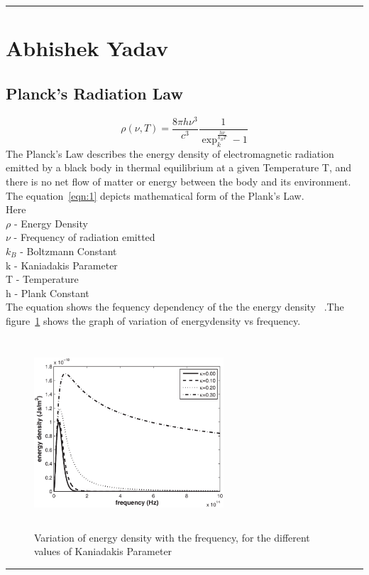 
\hrule
\section{Abhishek Yadav}
\subsection{Planck's Radiation Law}
\begin{equation}
	\rho(\nu,T)={\frac{8 \pi h \nu^3}{c^3}}  {\frac{1}{\exp_k^{\frac{h \nu}{k_BT}} - 1}}
	\label{eqn:1}
\end{equation}
The Planck's Law describes the energy density of electromagnetic radiation emitted by a black body in thermal equilibrium at a given Temperature T, and there is no net flow of matter or energy between the body and its environment.
The equation~\ref{eqn:1} depicts mathematical form of the Plank's Law. \\
Here \\
$\rho$ - Energy Density \\
$\nu$  - Frequency of radiation emitted \\
$k_B$  -  Boltzmann Constant \\
k      -  Kaniadakis Parameter \\
T      - Temperature \\
h      - Plank Constant \\
The equation shows the fequency dependency of the the energy density ~\cite{meb008}.The figure~\ref{fig:me20b008} shows the graph of variation of energydensity vs frequency.
\begin{figure}[h]
        \begin{center}
		\includegraphics[width=200pt,height=200pt]{me20b008.eps}
		\end{center}
        \caption{Variation of energy density with the frequency, for the different values of Kaniadakis Parameter}
        \label{fig:me20b008}
\end{figure}
\hrule

